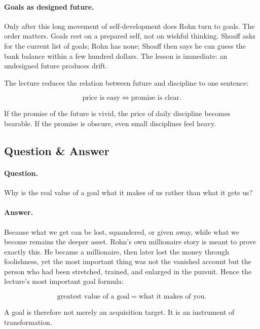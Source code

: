 \paragraph{Goals as designed future.}
Only after this long movement of self-development does Rohn turn to goals. The order matters. Goals rest on a prepared self, not on wishful thinking. Shoaff asks for the current list of goals; Rohn has none; Shoaff then says he can guess the bank balance within a few hundred dollars. The lesson is immediate: an undesigned future produces drift.

The lecture reduces the relation between future and discipline to one sentence:

\begin{equation}
\text{price is easy} \iff \text{promise is clear}.
\end{equation}

If the promise of the future is vivid, the price of daily discipline becomes bearable. If the promise is obscure, even small disciplines feel heavy.

\subsection{Question \& Answer}

\paragraph{Question.}
Why is the real value of a goal what it makes of us rather than what it gets us?

\paragraph{Answer.}
Because what we get can be lost, squandered, or given away, while what we become remains the deeper asset. Rohn's own millionaire story is meant to prove exactly this. He became a millionaire, then later lost the money through foolishness, yet the most important thing was not the vanished account but the person who had been stretched, trained, and enlarged in the pursuit. Hence the lecture's most important goal formula:

\begin{equation}
\text{greatest value of a goal} = \text{what it makes of you}.
\end{equation}

A goal is therefore not merely an acquisition target. It is an instrument of transformation.

